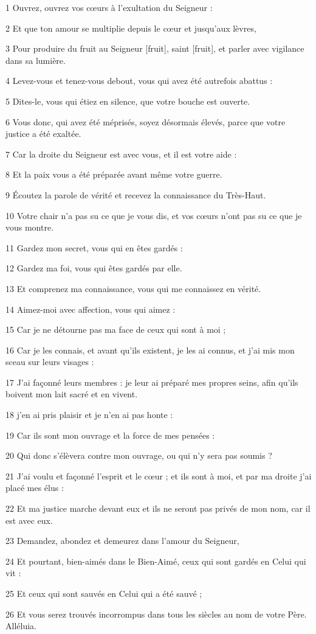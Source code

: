 \par 1 Ouvrez, ouvrez vos cœurs à l'exultation du Seigneur :
\par 2 Et que ton amour se multiplie depuis le cœur et jusqu'aux lèvres,
\par 3 Pour produire du fruit au Seigneur [fruit], saint [fruit], et parler avec vigilance dans sa lumière.
\par 4 Levez-vous et tenez-vous debout, vous qui avez été autrefois abattus :
\par 5 Dites-le, vous qui étiez en silence, que votre bouche est ouverte.
\par 6 Vous donc, qui avez été méprisés, soyez désormais élevés, parce que votre justice a été exaltée.
\par 7 Car la droite du Seigneur est avec vous, et il est votre aide :
\par 8 Et la paix vous a été préparée avant même votre guerre.
\par 9 Écoutez la parole de vérité et recevez la connaissance du Très-Haut.
\par 10 Votre chair n'a pas su ce que je vous dis, et vos cœurs n'ont pas su ce que je vous montre.
\par 11 Gardez mon secret, vous qui en êtes gardés :
\par 12 Gardez ma foi, vous qui êtes gardés par elle.
\par 13 Et comprenez ma connaissance, vous qui me connaissez en vérité.
\par 14 Aimez-moi avec affection, vous qui aimez :
\par 15 Car je ne détourne pas ma face de ceux qui sont à moi ;
\par 16 Car je les connais, et avant qu'ils existent, je les ai connus, et j'ai mis mon sceau sur leurs visages :
\par 17 J'ai façonné leurs membres : je leur ai préparé mes propres seins, afin qu'ils boivent mon lait sacré et en vivent.
\par 18 j'en ai pris plaisir et je n'en ai pas honte :
\par 19 Car ils sont mon ouvrage et la force de mes pensées :
\par 20 Qui donc s'élèvera contre mon ouvrage, ou qui n'y sera pas soumis ?
\par 21 J'ai voulu et façonné l'esprit et le cœur ; et ils sont à moi, et par ma droite j'ai placé mes élus :
\par 22 Et ma justice marche devant eux et ils ne seront pas privés de mon nom, car il est avec eux.
\par 23 Demandez, abondez et demeurez dans l'amour du Seigneur,
\par 24 Et pourtant, bien-aimés dans le Bien-Aimé, ceux qui sont gardés en Celui qui vit :
\par 25 Et ceux qui sont sauvés en Celui qui a été sauvé ;
\par 26 Et vous serez trouvés incorrompus dans tous les siècles au nom de votre Père. Alléluia.

